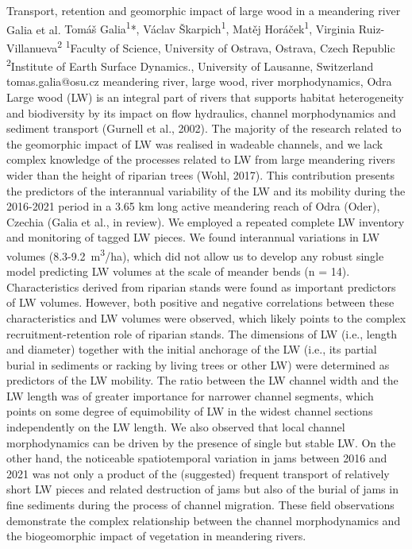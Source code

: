 \abstract
{Transport, retention and geomorphic impact of large wood in a meandering river} %
{Galia et al.} %
{Tomáš Galia\textsuperscript{1}*, Václav Škarpich\textsuperscript{1}, Matěj Horáček\textsuperscript{1}, Virginia Ruiz-Villanueva\textsuperscript{2}} %
{\TLtag} %
{\textsuperscript{1}Faculty of Science, University of Ostrava, Ostrava, Czech Republic\\
\textsuperscript{2}Institute of Earth Surface Dynamics., University of Lausanne, Switzerland
} %
{tomas.galia@osu.cz}  %
{meandering river, large wood, river morphodynamics, Odra}%
{Large wood (LW) is an integral part of rivers that supports habitat heterogeneity and biodiversity by its impact on flow hydraulics, channel morphodynamics and sediment transport (Gurnell et al., 2002). The majority of the research related to the geomorphic impact of LW was realised in wadeable channels, and we lack complex knowledge of the processes related to LW from large meandering rivers wider than the height of riparian trees (Wohl, 2017). This contribution presents the predictors of the interannual variability of the LW and its mobility during the 2016-2021 period in a 3.65 km long active meandering reach of Odra (Oder), Czechia (Galia et al., in review). We employed a repeated complete LW inventory and monitoring of tagged LW pieces. We found interannual variations in LW volumes (8.3-9.2~m\textsuperscript{3}/ha), which did not allow us to develop any robust single model predicting LW volumes at the scale of meander bends (n = 14). Characteristics derived from riparian stands were found as important predictors of LW volumes. However, both positive and negative correlations between these characteristics and LW volumes were observed, which likely points to the complex recruitment-retention role of riparian stands. The dimensions of LW (i.e., length and diameter) together with the initial anchorage of the LW (i.e., its partial burial in sediments or racking by living trees or other LW) were determined as predictors of the LW mobility. The ratio between the LW channel width and the LW length was of greater importance for narrower channel segments, which points on some degree of equimobility of LW in the widest channel sections independently on the LW length. We also observed that local channel morphodynamics can be driven by the presence of single but stable LW. On the other hand, the noticeable spatiotemporal variation in jams between 2016 and 2021 was not only a product of the (suggested) frequent transport of relatively short LW pieces and related destruction of jams but also of the burial of jams in fine sediments during the process of channel migration. These field observations demonstrate the complex relationship between the channel morphodynamics and the biogeomorphic impact of vegetation in meandering rivers.
}%
